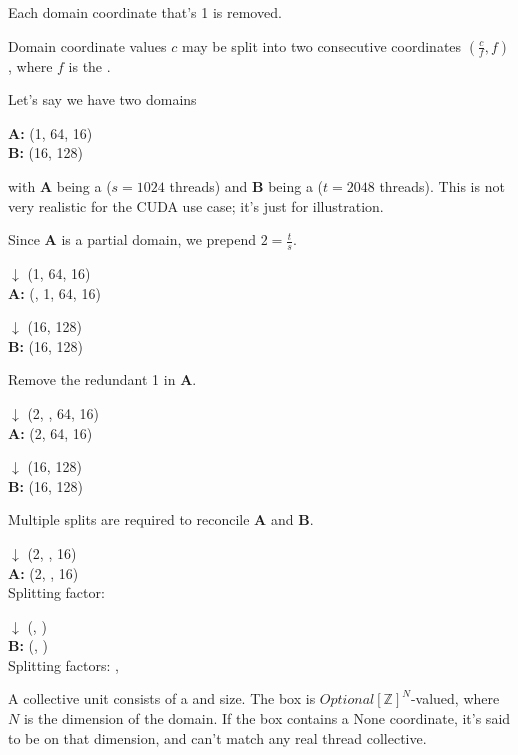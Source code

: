 \filbreak
{} Each domain coordinate that's 1 is removed.

\filbreak
{} Domain coordinate values $c$ may be split into two consecutive coordinates $(\frac{c}{f}, f)$, where $f$ is the .

\filbreak
{}

Let's say we have two domains

\textbf{A:} (1, 64, 16)\\
\textbf{B:} (16, 128)

with \textbf{A} being a  ($s = 1024$ threads) and \textbf{B} being a  ($t = 2048$ threads).
This is not very realistic for the CUDA use case; it's just for illustration.

\filbreak
{} Since \textbf{A} is a partial domain, we prepend $2 = \frac{t}{s}$.

$\downarrow$ {\color{grayttColor} (1, 64, 16)} \\
\textbf{A:} (, 1, 64, 16)

$\downarrow$ {\color{grayttColor} (16, 128)} \\
\textbf{B:} (16, 128)

\filbreak
{} Remove the redundant 1 in \textbf{A}.

$\downarrow$ {\color{grayttColor} (2, , 64, 16)} \\
\textbf{A:} (2, 64, 16)

$\downarrow$ {\color{grayttColor} (16, 128)} \\
\textbf{B:} (16, 128)

\filbreak
{} Multiple splits are required to reconcile \textbf{A} and \textbf{B}.

$\downarrow$ {\color{grayttColor} (2, , 16)} \\
\textbf{A:} (2, , 16) \\
Splitting factor: 

$\downarrow$ {\color{grayttColor} (, )} \\
\textbf{B:} (, ) \\
Splitting factors: , 

\filbreak
{}

A collective unit consists of a  and  size.
The box is $\textit{Optional}[\mathbb{Z}]^N$-valued, where $N$ is the dimension of the domain.
If the box contains a None coordinate, it's said to be  on that dimension, and can't match any real thread collective.

